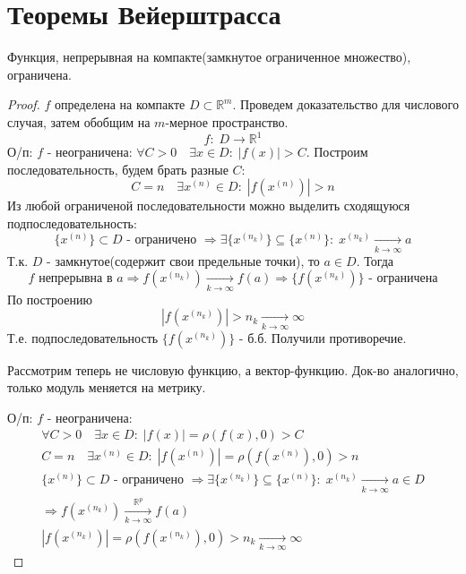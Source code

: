 \newcommand\RRR{\ensuremath{\mathbb{R}}}
\newcommand{\rom}[1]
    {\MakeUppercase{\romannumeral #1}}
\theoremstyle{definition}
\newpage
\section{Теоремы Вейерштрасса}
    
\begin{theorem}[\rom{1} теорема Вейерштрасса]
    Функция, непрерывная на компакте(замкнутое ограниченное множество), ограничена.
\end{theorem}

\begin{proof}
    $f$ определена на компакте $D \subset \RRR^m$. Проведем доказательство для числового случая, затем обобщим на $m$-мерное пространство.
    \[
        f:\; D \rightarrow \RRR^1
    \]
    О/п: $f$ - неограничена: $\forall C > 0 \quad \exists x \in D:\;|f(x)| > C$. 
    Построим последовательность, будем брать разные $C$:
    \[
        C=n \quad \exists x^{(n)} \in D:\; |f(x^{(n)})| > n
    \]
    Из любой ограниченой последовательности можно выделить сходящуюся подпоследовательность:
    \[
        \{x^{(n)}\} \subset D\text{ - ограничено }\Rightarrow \exists \{ x^{(n_k)} \} \subseteq \{x^{(n)}\}:\; x^{(n_k)} \xrightarrow[k \rightarrow \infty]{} a
    \]
    Т.к. $D$ - замкнутое(содержит свои предельные точки), то $a \in D$. Тогда
    \[
        f \text{ непрерывна в } a \Rightarrow f(x^{(n_k)}) \xrightarrow[k \rightarrow \infty]{} f(a) \Rightarrow \{f(x^{(n_k)})\} \text{ - ограничена} 
    \]
    По построению 
    \[
        |f(x^{(n_k)})| > n_k  \xrightarrow[k \rightarrow \infty]{} \infty
    \]
    Т.е. подпоследовательность $\{f(x^{(n_k)})\}$ - б.б. Получили противоречие. 
        
    Рассмотрим теперь не числовую функцию, а вектор-функцию.
    Док-во аналогично, только модуль меняется на метрику.

    О/п: $f$ - неограничена:
    \begin{gather*}
        \forall C > 0 \quad \exists x \in D:\;|f(x)| = \rho(f(x), 0) > C\\
        C=n \quad \exists x^{(n)} \in D:\; |f(x^{(n)})| = \rho(f(x^{(n)}), 0) > n\\
        \{x^{(n)}\} \subset D\text{ - ограничено }\Rightarrow \exists \{ x^{(n_k)} \} \subseteq \{x^{(n)}\}:\; x^{(n_k)} \xrightarrow[k \rightarrow \infty]{} a \in D\\
        \Rightarrow f(x^{(n_k)}) \xrightarrow[k \rightarrow \infty]{\RRR^p} f(a)\\
        |f(x^{(n_k)})| = \rho(f(x^{(n_k)}), 0) > n_k  \xrightarrow[k \rightarrow \infty]{} \infty
    \end{gather*}

\end{proof}

